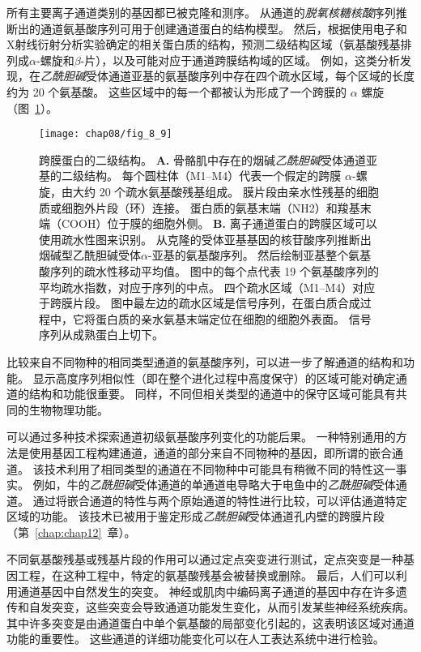 所有主要离子通道类别的基因都已被克隆和测序。
从通道的\textit{脱氧核糖核酸}序列推断出的通道氨基酸序列可用于创建通道蛋白的结构模型。
然后，根据使用电子和X射线衍射分析实验确定的相关蛋白质的结构，预测二级结构区域（氨基酸残基排列成$\alpha$-螺旋和$\beta$-片），以及可能对应于通道跨膜结构域的区域。
例如，这类分析发现，在\textit{乙酰胆碱}受体通道亚基的氨基酸序列中存在四个疏水区域，每个区域的长度约为 20 个氨基酸。
这些区域中的每一个都被认为形成了一个跨膜的 $\alpha$ 螺旋（图~\ref{fig:8_9}）。


\begin{figure}[htbp]
	\centering
	\texttt{[image: chap08/fig\_8\_9]}
	\caption{跨膜蛋白的二级结构。
		\textbf{A.} 骨骼肌中存在的烟碱\textit{乙酰胆碱}受体通道亚基的二级结构。
		每个圆柱体（M1–M4）代表一个假定的跨膜 $\alpha$-螺旋，由大约 20 个疏水氨基酸残基组成。
		膜片段由亲水性残基的细胞质或细胞外片段（环）连接。
		蛋白质的氨基末端（NH2）和羧基末端（COOH）位于膜的细胞外侧。
		\textbf{B.} 离子通道蛋白的跨膜区域可以使用疏水性图来识别。
		从克隆的受体亚基基因的核苷酸序列推断出烟碱型乙酰胆碱受体$\alpha$-亚基的氨基酸序列。
		然后绘制亚基整个氨基酸序列的疏水性移动平均值。
		图中的每个点代表 19 个氨基酸序列的平均疏水指数，对应于序列的中点。
		四个疏水区域（M1–M4）对应于跨膜片段。
		图中最左边的疏水区域是信号序列，在蛋白质合成过程中，它将蛋白质的亲水氨基末端定位在细胞的细胞外表面。
		信号序列从成熟蛋白上切下\cite{schofield1987sequence}。}
	\label{fig:8_9}
\end{figure}


比较来自不同物种的相同类型通道的氨基酸序列，可以进一步了解通道的结构和功能。
显示高度序列相似性（即在整个进化过程中高度保守）的区域可能对确定通道的结构和功能很重要。
同样，不同但相关类型的通道中的保守区域可能具有共同的生物物理功能。


可以通过多种技术探索通道初级氨基酸序列变化的功能后果。
一种特别通用的方法是使用基因工程构建通道，通道的部分来自不同物种的基因，即所谓的嵌合通道。
该技术利用了相同类型的通道在不同物种中可能具有稍微不同的特性这一事实。
例如，牛的\textit{乙酰胆碱}受体通道的单通道电导略大于电鱼中的\textit{乙酰胆碱}受体通道。
通过将嵌合通道的特性与两个原始通道的特性进行比较，可以评估通道特定区域的功能。
该技术已被用于鉴定形成\textit{乙酰胆碱}受体通道孔内壁的跨膜片段（第~\ref{chap:chap12}~章）。


不同氨基酸残基或残基片段的作用可以通过定点突变进行测试，定点突变是一种基因工程，在这种工程中，特定的氨基酸残基会被替换或删除。
最后，人们可以利用通道基因中自然发生的突变。
神经或肌肉中编码离子通道的基因中存在许多遗传和自发突变，这些突变会导致通道功能发生变化，从而引发某些神经系统疾病。
其中许多突变是由通道蛋白中单个氨基酸的局部变化引起的，这表明该区域对通道功能的重要性。
这些通道的详细功能变化可以在人工表达系统中进行检验。



